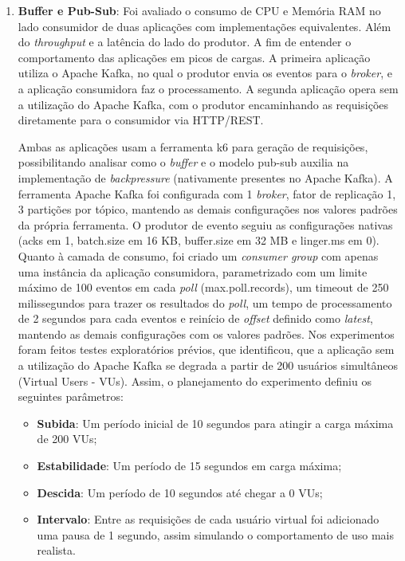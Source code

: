 \documentclass[12pt]{article}
\begin{document}
  \begin{enumerate}
    \item \textbf{Buffer e Pub-Sub}: Foi avaliado o consumo de CPU e Memória RAM no lado consumidor de duas aplicações com implementações equivalentes. Além do \textit{throughput} e a latência do lado do produtor. A fim de entender o comportamento das aplicações em picos de cargas. A primeira aplicação utiliza o Apache Kafka, no qual o produtor envia os eventos para o \textit{broker}, e a aplicação consumidora faz o processamento. A segunda aplicação opera sem a utilização do Apache Kafka, com o produtor encaminhando as requisições diretamente para o consumidor via HTTP/REST.

    Ambas as aplicações usam a ferramenta k6 para geração de requisições, possibilitando analisar como o \textit{buffer} e o modelo pub-sub auxilia na implementação de \textit{backpressure} (nativamente presentes no Apache Kafka). A ferramenta Apache Kafka foi configurada com 1 \textit{broker}, fator de replicação 1, 3 partições por tópico, mantendo as demais configurações nos valores padrões da própria ferramenta. O produtor de evento seguiu as configurações nativas (acks em 1, batch.size em 16 KB, buffer.size em 32 MB e linger.ms em 0). Quanto à camada de consumo, foi criado um \textit{consumer group} com apenas uma instância da aplicação consumidora, parametrizado com um limite máximo de 100 eventos em cada \textit{poll} (max.poll.records), um timeout de 250 milissegundos para trazer os resultados do \textit{poll}, um tempo de processamento de 2 segundos para cada eventos e reinício de \textit{offset} definido como \textit{latest}, mantendo as demais configurações com os valores padrões. Nos experimentos foram feitos testes exploratórios prévios, que identificou, que a aplicação sem a utilização do Apache Kafka se degrada a partir de 200 usuários simultâneos (Virtual Users - VUs). Assim, o planejamento do experimento definiu os seguintes parâmetros:
    \begin{itemize}
      \item \textbf{Subida}: Um período inicial de 10 segundos para atingir a carga máxima de 200 VUs;
      \item \textbf{Estabilidade}: Um período de 15 segundos em carga máxima;
      \item \textbf{Descida}: Um período de 10 segundos até chegar a 0 VUs;
      \item \textbf{Intervalo}: Entre as requisições de cada usuário virtual foi adicionado uma pausa de 1 segundo, assim simulando o comportamento de uso mais realista.
    \end{itemize}


\end{enumerate}
\end{document}
